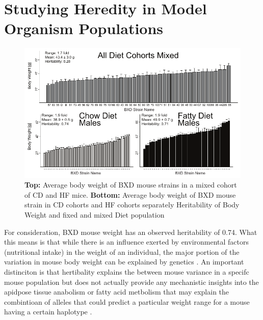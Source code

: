\documentclass[a4paper,11pt,twoside]{book}
\begin{document}
	\section{Studying Heredity in Model Organism Populations}
	\begin{figure}[!htbp]
		\includegraphics[width=\textwidth]{1.Introduction_Figures/BodyWeights.pdf}
		\caption{ \textbf{Top:} Average body weight of BXD mouse strains in a mixed cohort of CD and HF mice. \textbf{Bottom:} Average body weight of BXD mouse strain in CD cohorts and HF cohorts separately
			Heritability of Body Weight and fixed and mixed Diet population}
		\label{fig:Heritablity in Diet and Mixed Populations}
	\end{figure}
	
	For consideration, BXD mouse weight has an observed heritability of 0.74. What this means is that while there is an influence exerted by environmental factors (nutritional intake) in the weight of an individual, the major portion of the variation in mouse body weight can be explained by genetics \citep{GerhardAdam2012}. An important distinciton is that hertibality explains the between mouse variance in a specifc mouse population but does not actually provide any mechanistic insights into the apidpose tissue anabolism or fatty acid metbolism that may explain the combintioan of alleles that could predict a particular weight range for a mouse having a certain haplotype \citep{GerhardAdam2012}.
	
\end{document}
